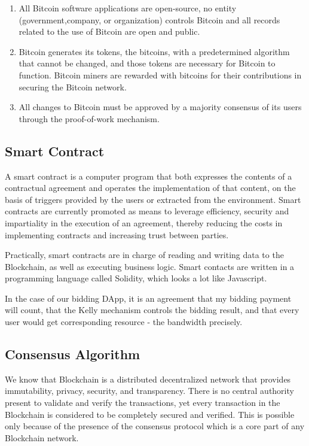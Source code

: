 \begin{enumerate}
\item All Bitcoin software applications are open-source, no entity (government,company, or organization) controls Bitcoin and all records related to the use of Bitcoin are open and public.
\item Bitcoin generates its tokens, the bitcoins, with a predetermined algorithm that cannot be changed, and those tokens are necessary for Bitcoin to function. Bitcoin miners are rewarded with bitcoins for their contributions in securing the Bitcoin network.
\item All changes to Bitcoin must be approved by a majority consensus of its users through the proof-of-work mechanism.
\end{enumerate}

\subsection{Smart Contract}

A smart contract is a computer program that both expresses the contents of a contractual agreement and operates the implementation of that content, on the basis of triggers provided by the users or extracted from the environment. Smart contracts are currently promoted as means to leverage efficiency, security and impartiality in the execution of an agreement, thereby reducing the costs in implementing contracts and increasing trust between parties.

Practically, smart contracts are in charge of reading and writing data to the Blockchain, as well as executing business logic. Smart contacts are written in a programming language called Solidity, which looks a lot like Javascript.

In the case of our bidding DApp, it is an agreement that my bidding payment will count, that the Kelly mechanism controls the bidding result, and that every user would get corresponding resource - the bandwidth precisely.

\subsection{Consensus Algorithm}

We know that Blockchain is a distributed decentralized network that provides immutability, privacy, security, and transparency. There is no central authority present to validate and verify the transactions, yet every transaction in the Blockchain is considered to be completely secured and verified. This is possible only because of the presence of the consensus protocol which is a core part of any Blockchain network. 

